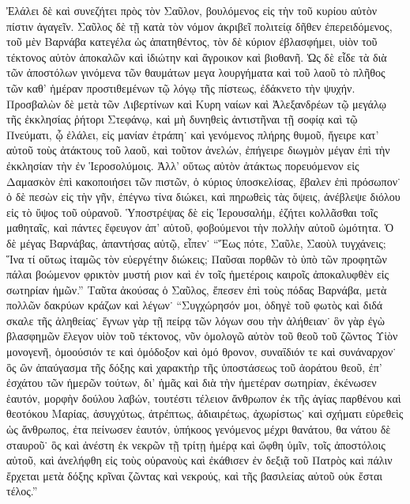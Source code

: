 Ἐλάλει δὲ καὶ συνεζήτει πρὸς τὸν Σαῦλον, βουλόμενος
εἰς τὴν τοῦ κυρίου αὐτὸν πίστιν ἀγαγεῖν. Σαῦλος δὲ
τῇ κατὰ τὸν νόμον ἀκριβεῖ πολιτείᾳ δῆθεν ἐπερειδόμενος,
τοῦ μὲν Βαρνάβα κατεγέλα ὡς ἀπατηθέντος, τὸν δὲ
κύριον ἐβλασφήμει, υἱὸν τοῦ τέκτονος αὐτὸν ἀποκαλῶν
καὶ ἰδιώτην καὶ ἄγροικον καὶ βιοθανῆ. Ὡς δὲ εἶδε τὰ
διὰ τῶν ἀποστόλων γινόμενα τῶν θαυμάτων μεγα%
λουργήματα καὶ τοῦ λαοῦ τὸ πλῆθος τῶν καθ’ ἡμέραν
προστιθεμένων τῷ λόγῳ τῆς πίστεως, ἐδάκνετο τὴν
ψυχήν. Προσβαλὼν δὲ μετὰ τῶν Λιβερτίνων καὶ Κυρη%
ναίων καὶ Ἀλεξανδρέων τῷ μεγάλῳ τῆς ἐκκλησίας ῥήτορι
Στεφάνῳ, καὶ μὴ δυνηθεὶς ἀντιστῆναι τῇ σοφίᾳ καὶ
τῷ Πνεύματι, ᾧ ἐλάλει, εἰς μανίαν ἐτράπη˙ καὶ γενόμενος
πλήρης θυμοῦ, ἤγειρε κατ’ αὐτοῦ τοὺς ἀτάκτους τοῦ λαοῦ,
καὶ τοῦτον ἀνελών, ἐπήγειρε διωγμὸν μέγαν ἐπὶ τὴν
ἐκκλησίαν τὴν ἐν Ἱεροσολύμοις. Ἀλλ’ οὕτως αὐτὸν ἀτάκτως
πορευόμενον εἰς Δαμασκὸν ἐπὶ κακοποιήσει τῶν πιστῶν,
ὁ κύριος ὑποσκελίσας, ἔβαλεν ἐπὶ πρόσωπον˙ ὁ δὲ
πεσὼν εἰς τὴν γῆν, ἐπέγνω τίνα διώκει, καὶ πηρωθεὶς
τὰς ὄψεις, ἀνέβλεψε διόλου εἰς τὸ ὕψος τοῦ οὐρανοῦ.
Ὑποστρέψας δὲ εἰς Ἱερουσαλήμ, ἐζήτει κολλᾶσθαι τοῖς
μαθηταῖς, καὶ πάντες ἔφευγον ἀπ’ αὐτοῦ, φοβούμενοι τὴν
πολλὴν αὐτοῦ ὠμότητα. Ὁ δὲ μέγας Βαρνάβας, ἀπαντήσας
αὐτῷ, εἶπεν˙ \enquote{Ἕως πότε, Σαῦλε, Σαοὺλ τυγχάνεις; Ἵνα
τί οὕτως ἰταμῶς τὸν εὐεργέτην διώκεις; Παῦσαι πορθῶν
τὸ ὑπὸ τῶν προφητῶν πάλαι βοώμενον φρικτὸν μυστή%
ριον καὶ ἐν τοῖς ἡμετέροις καιροῖς ἀποκαλυφθὲν εἰς
σωτηρίαν ἡμῶν.} Ταῦτα ἀκούσας ὁ Σαῦλος, ἔπεσεν ἐπὶ
τοὺς πόδας Βαρνάβα, μετὰ πολλῶν δακρύων κράζων καὶ
λέγων˙ \enquote{Συγχώρησόν μοι, ὁδηγὲ τοῦ φωτὸς καὶ διδά%
σκαλε τῆς ἀληθείας˙ ἔγνων γὰρ τῇ πείρᾳ τῶν λόγων
σου τὴν ἀλήθειαν˙ ὃν γὰρ ἐγὼ βλασφημῶν ἔλεγον υἱὸν
τοῦ τέκτονος, νῦν ὁμολογῶ αὐτὸν τοῦ θεοῦ τοῦ ζῶντος
Υἱὸν μονογενῆ, ὁμοούσιόν τε καὶ ὁμόδοξον καὶ ὁμό%
θρονον, συναΐδιόν τε καὶ συνάναρχον˙ ὃς ὢν ἀπαύγασμα
τῆς δόξης καὶ χαρακτὴρ τῆς ὑποστάσεως τοῦ ἀοράτου
θεοῦ, ἐπ’ ἐσχάτου τῶν ἡμερῶν τούτων, δι’ ἡμᾶς καὶ διὰ
τὴν ἡμετέραν σωτηρίαν, ἐκένωσεν ἑαυτόν, μορφὴν δούλου
λαβών, τουτέστι τέλειον ἄνθρωπον ἐκ τῆς ἁγίας παρθένου
καὶ θεοτόκου Μαρίας, ἀσυγχύτως, ἀτρέπτως, ἀδιαιρέτως,
ἀχωρίστως˙ καὶ σχήματι εὑρεθεὶς ὡς ἄνθρωπος, ἐτα%
πείνωσεν ἑαυτόν, ὑπήκοος γενόμενος μέχρι θανάτου, θα%
νάτου δὲ σταυροῦ˙ ὃς καὶ ἀνέστη ἐκ νεκρῶν τῇ τρίτῃ
ἡμέρᾳ καὶ ὤφθη ὑμῖν, τοῖς ἀποστόλοις αὐτοῦ, καὶ
ἀνελήφθη εἰς τοὺς οὐρανοὺς καὶ ἐκάθισεν ἐν δεξιᾷ τοῦ
Πατρὸς καὶ πάλιν ἔρχεται μετὰ δόξης κρῖναι ζῶντας
καὶ νεκρούς, καὶ τῆς βασιλείας αὐτοῦ οὐκ ἔσται τέλος.}


